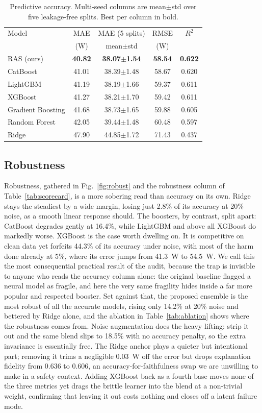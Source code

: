\documentclass[conference]{IEEEtran}
\newcommand{\best}[1]{\textbf{#1}}
\begin{document}
\begin{table}[t]
\centering
\caption{Predictive accuracy. Multi-seed columns are mean$\pm$std over five leakage-free splits. Best per column in bold.}
\label{tab:acc}
\small
\begin{tabular}{@{}lcccc@{}}
\toprule
Model & MAE & MAE (5 splits) & RMSE & $R^2$ \\
 & (W) & mean$\pm$std & (W) & \\
\midrule
RAS (ours) & \best{40.82} & \best{38.07$\pm$1.54} & \best{58.54} & \best{0.622} \\
CatBoost & 41.01 & 38.39$\pm$1.48 & 58.67 & 0.620 \\
LightGBM & 41.19 & 38.19$\pm$1.66 & 59.37 & 0.611 \\
XGBoost & 41.27 & 38.21$\pm$1.70 & 59.42 & 0.611 \\
Gradient Boosting & 41.68 & 38.73$\pm$1.65 & 59.88 & 0.605 \\
Random Forest & 42.05 & 39.44$\pm$1.48 & 60.48 & 0.597 \\
Ridge & 47.90 & 44.85$\pm$1.72 & 71.43 & 0.437 \\
\bottomrule
\end{tabular}
\end{table}

\subsection{Robustness}
Robustness, gathered in Fig.~\ref{fig:robust} and the robustness column of Table~\ref{tab:scorecard}, is a more sobering read than accuracy on its own. Ridge stays the steadiest by a wide margin, losing just 2.8\% of its accuracy at 20\% noise, as a smooth linear response should. The boosters, by contrast, split apart: CatBoost degrades gently at 16.4\%, while LightGBM and above all XGBoost do markedly worse. XGBoost is the case worth dwelling on. It is competitive on clean data yet forfeits 44.3\% of its accuracy under noise, with most of the harm done already at 5\%, where its error jumps from 41.3~W to 54.5~W. We call this the most consequential practical result of the audit, because the trap is invisible to anyone who reads the accuracy column alone: the original baseline flagged a neural model as fragile, and here the very same fragility hides inside a far more popular and respected booster. Set against that, the proposed ensemble is the most robust of all the accurate models, rising only 14.2\% at 20\% noise and bettered by Ridge alone, and the ablation in Table~\ref{tab:ablation} shows where the robustness comes from. Noise augmentation does the heavy lifting: strip it out and the same blend slips to 18.5\% with no accuracy penalty, so the extra invariance is essentially free. The Ridge anchor plays a quieter but intentional part; removing it trims a negligible 0.03~W off the error but drops explanation fidelity from 0.636 to 0.606, an accuracy-for-faithfulness swap we are unwilling to make in a safety context. Adding XGBoost back as a fourth base moves none of the three metrics yet drags the brittle learner into the blend at a non-trivial weight, confirming that leaving it out costs nothing and closes off a latent failure mode.
\end{document}
